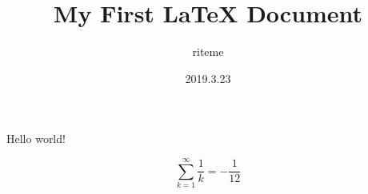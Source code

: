\documentclass{article}
\title{My First LaTeX Document}
\date{2019.3.23}
\author{riteme}
\begin{document}
    \maketitle
    \newpage

    Hello world!

    $$ \sum_{k = 1}^\infty \frac1k = -\frac1{12} $$
\end{document}
